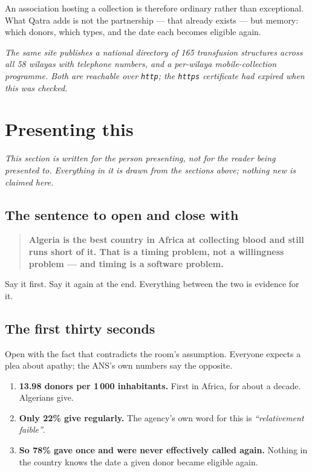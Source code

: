 \documentclass[11pt,a4paper]{article}
\newcommand{\note}[1]{{\small\color{qatraGrey}\textit{#1}}}
\begin{document}
An association hosting a collection is therefore ordinary rather than
exceptional. What Qatra adds is not the partnership --- that already exists ---
but memory: which donors, which types, and the date each becomes eligible
again.

\note{The same site publishes a national directory of 165 transfusion
structures across all 58 wilayas with telephone numbers, and a per-wilaya
mobile-collection programme. Both are reachable over \texttt{http}; the
\texttt{https} certificate had expired when this was checked.}


\section{Presenting this}\label{sec:pitch}

\note{This section is written for the person presenting, not for the reader
being presented to. Everything in it is drawn from the sections above; nothing
new is claimed here.}

\subsection{The sentence to open and close with}

\begin{quote}
\textbf{Algeria is the best country in Africa at collecting blood and still
runs short of it. That is a timing problem, not a willingness problem — and
timing is a software problem.}
\end{quote}

Say it first. Say it again at the end. Everything between the two is evidence
for it.

\subsection{The first thirty seconds}

Open with the fact that contradicts the room's assumption. Everyone expects a
plea about apathy; the ANS's own numbers say the opposite.

\begin{enumerate}[leftmargin=1.4em]
  \item \textbf{13.98 donors per 1\,000 inhabitants.} First in Africa, for
        about a decade. Algerians give.
  \item \textbf{Only 22\% give regularly.} The agency's own word for this is
        \emph{``relativement faible''}.
  \item \textbf{So 78\% gave once and were never effectively called again.}
        Nothing in the country knows the date a given donor became eligible
        again.
\end{enumerate}
\end{document}
